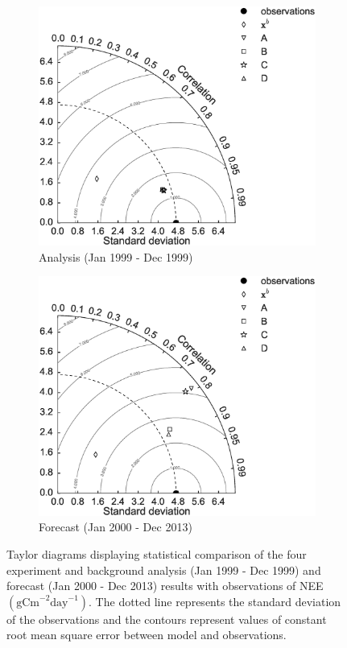 \documentclass[review]{elsarticle}
\begin{document}
\begin{figure}[ht]
    \centering
    \begin{subfigure}[b]{0.49\textwidth}
        \includegraphics[width=\textwidth]{tdcvt_a.eps}
        \caption{Analysis (Jan 1999 - Dec 1999)}
        \label{fig:td_a}
    \end{subfigure}
    \begin{subfigure}[b]{0.49\textwidth}
        \includegraphics[width=\textwidth]{tdcvt_f.eps}
        \caption{Forecast (Jan 2000 - Dec 2013)}
        \label{fig:td_f}
    \end{subfigure}
    \caption{Taylor diagrams displaying statistical comparison of the four experiment and background analysis (Jan 1999 - Dec 1999) and forecast (Jan 2000 - Dec 2013) results with observations of NEE $( \text{gCm}^{-2}\text{day}^{-1})$. The dotted line represents the standard deviation of the observations and the contours represent values of constant root mean square error between model and observations.}
    \label{fig:taylordiag}
\end{figure}
\end{document}
